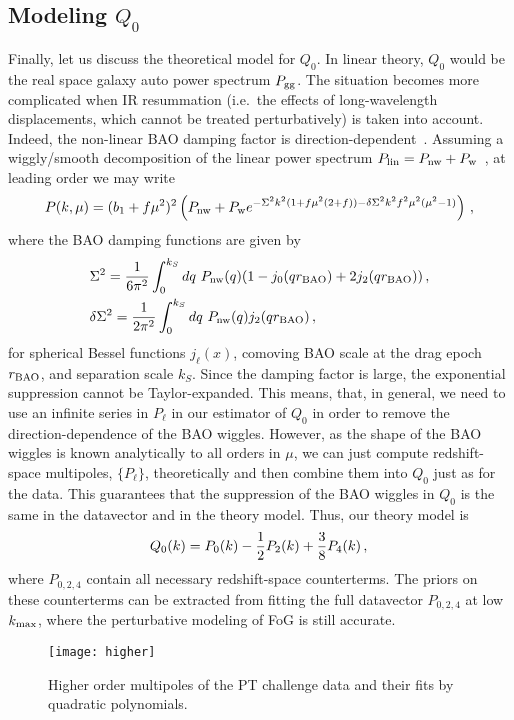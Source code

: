 \documentclass[12pt,a4paper]{article}
\newcommand{\be}{\begin{equation}}
\newcommand{\ee}{\end{equation}}
\begin{document}
\subsection{Modeling $Q_0$}
Finally, let us discuss the theoretical model for
$Q_0$. In linear theory, $Q_0$ would be the real space galaxy auto power spectrum $P_{\rm gg}$. The situation becomes more complicated 
when IR resummation (i.e.~the effects of long-wavelength displacements, which cannot be treated perturbatively) is taken into account. 
Indeed, the non-linear BAO damping factor is direction-dependent~\cite{Ivanov:2018gjr}. 
Assuming a wiggly/smooth decomposition of the linear power spectrum $P_{\rm lin}=P_{\rm nw}+P_{\rm w}$~\cite{Baldauf:2015xfa,Blas:2015tla,Blas:2016sfa,Vasudevan:2019ewf}, at leading order we may write 
\be
P(k,\mu)=(b_1+f\mu^2)^2\left( P_{\rm nw}+ 
P_{\rm w}e^{-\Sigma^2k^2 (1+f\mu^2(2+f))-\delta \Sigma^2 k^2 f^2 \mu^2(\mu^2-1)}\right)\,,
\ee
where the BAO damping functions are given by 
\be 
\begin{split}
& \Sigma^2 =\frac{1}{6\pi^2}\int_0^{k_S} dq~P_{\rm nw}(q)
(1-j_0(qr_{\rm BAO})+2j_2(qr_{\rm BAO}))\,,\\
& \delta\Sigma^2 = \frac{1}{2\pi^2}\int_0^{k_S} dq~P_{\rm nw}(q)
j_2(qr_{\rm BAO})\,,
\end{split}
\ee
for spherical Bessel functions $j_\ell(x)$, comoving 
BAO scale at the drag epoch $r_{\rm BAO}$, and separation scale $k_S$. 
Since the damping factor is large, the exponential suppression cannot be Taylor-expanded. 
This means, that, in general, 
we need to use an infinite series in $P_\ell$ in our 
estimator of $Q_0$ in order to remove the direction-dependence 
of the BAO wiggles.  
However, as the shape of the BAO wiggles is known analytically to all orders in $\mu$,
we can just compute
redshift-space multipoles, $\{P_\ell\}$, theoretically
and then combine them into $Q_0$ 
just as for the data. 
This guarantees that the suppression of the BAO wiggles 
in $Q_0$ is the same in the datavector and in the theory model.
Thus, our theory model is 
\be
\label{eq:Q0mod}
Q_0(k)=P_0(k)-\frac{1}{2}P_2(k)+\frac{3}{8}P_{4}(k)\,,\\ 
\ee
where $P_{0,2,4}$ contain all necessary redshift-space counterterms. The priors on these counterterms can be extracted from fitting the full datavector $P_{0,2,4}$ at low $k_{\rm max}$, where the perturbative modeling of FoG is still accurate.


\begin{figure*}[h!]
\centering
 \texttt{[image: higher]}
    \caption{Higher order multipoles of the PT challenge data and their fits by quadratic polynomials.  
    }
    \label{fig:snr}
\end{figure*}
\end{document}
